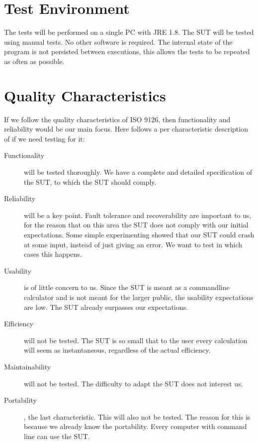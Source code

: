 \documentclass[11pt,a4paper]{article}
\begin{document}
\section{Test Environment}
The tests will be performed on a single PC with JRE 1.8. The SUT will be tested using manual tests. No other software is required. The internal state of the program is not persisted between executions, this allows the tests to be repeated as often as possible.

\section{Quality Characteristics}


If we follow the quality characteristics of ISO 9126, then functionality and reliability would be our main focus. Here follows a per characteristic description of if we need testing for it:
\begin{description}
	\item[Functionality] will be tested thoroughly. We have a complete and detailed specification of the SUT, to which the SUT should comply.
	\item[Reliability] will be a key point. Fault tolerance and recoverability are important to us, for the reason that on this area the SUT does not comply with our initial expectations. Some simple experimenting showed that our SUT could crash at some input, instead of just giving an error. We want to test in which cases this happens.
	\item[Usability] is of little concern to us. Since the SUT is meant as a commandline calculator and is not meant for the larger public, the usability expectations are low. The SUT already surpasses our expectations.
	\item[Efficiency] will not be tested. The SUT is so small that to the user every calculation will seem as instantaneous, regardless of the actual efficiency.
	\item[Maintainability] will not be tested. The difficulty to adapt the SUT does not interest us.
	\item[Portability], the last characteristic. This will also not be tested. The reason for this is because we already know the portability. Every computer with command line can use the SUT.
\end{description}
\end{document}
